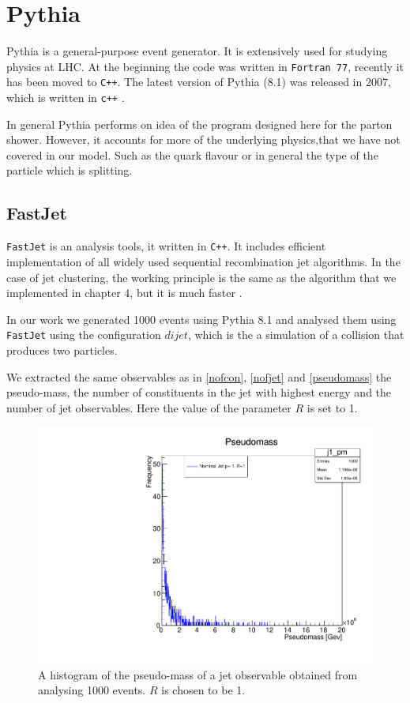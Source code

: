 \chapter{Pythia}
Pythia is a general-purpose event generator. It is extensively used for studying physics at LHC. At the beginning the code was written in \verb+Fortran 77+, recently it has been moved to \verb!C++!. The latest version of Pythia (8.1) was released in 2007, which is written in \verb!c++!  \citep{Buckley:2011ms}. 

In general Pythia performs on idea of the program designed here for the parton shower. However, it accounts for more of the underlying physics,that we have not covered in our model. Such  as the quark flavour or in general the type of the particle which is splitting.  

\section{FastJet} 

\verb+FastJet+ is an analysis tools, it written in \verb!C++!. It includes efficient implementation of all widely used sequential recombination jet algorithms. In the case of jet clustering, the working principle is the same as the algorithm that we implemented in chapter 4, but it is much faster \citep{Buckley:2011ms}. 

In our work we generated 1000 events using Pythia 8.1 and analysed them using \verb+FastJet+ using the configuration $dijet$, which is the a simulation of a collision that produces two particles. 

We extracted the same  observables as in \ref{nofcon}, \ref{nofjet} and \ref{pseudomass}  the pseudo-mass, the number of constituents in the jet with highest energy and the number of jet observables. Here the value of the parameter $R$ is set to 1.
\begin{figure}[hbtp]
\centering
\includegraphics[scale=.7]{images/myplot1.pdf}
\caption{A histogram of the pseudo-mass of a jet observable obtained from analysing 1000 events. $R$ is chosen to be 1.}
\end{figure}



